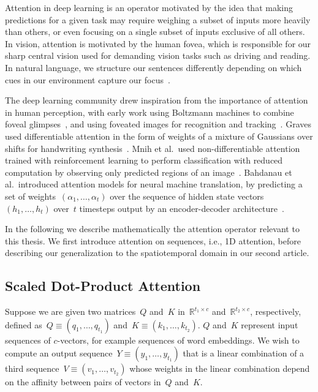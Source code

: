 Attention in deep learning is an operator motivated by the idea that making
predictions for a given task may require weighing a subset of inputs more
heavily than others, or even focusing on a single subset of inputs exclusive of
all others.
In vision, attention is motivated by the human fovea, which is responsible for
our sharp central vision used for demanding vision tasks such as driving and
reading.
In natural language, we structure our sentences differently depending on which
cues in our environment capture our focus~\citep{myachykov2005attention}.

The deep learning community drew inspiration from the importance of attention
in human perception, with early work using Boltzmann machines to combine foveal
glimpses~\citep{larochelle2010learning}, and using foveated images for
recognition and tracking~\citep{denil2012learning}.
Graves used differentiable attention in the form of weights of a mixture of
Gaussians over shifts for handwriting synthesis~\citep{graves2013generating}.
Mnih et al.\ used non-differentiable attention trained with reinforcement
learning to perform classification with reduced computation by observing only
predicted regions of an image~\citep{mnih2014recurrent}.
Bahdanau et al.\ introduced attention models for neural machine translation,
by predicting a set of weights~$(\alpha_1, \dots, \alpha_t)$ over the sequence
of hidden state vectors~$(h_1, \dots, h_t)$ over~$t$ timesteps output by an
encoder-decoder architecture~\citep{cho2014ontheproperties}.

In the following we describe mathematically the attention operator relevant to
this thesis.
We first introduce attention on sequences, i.e., 1D attention, before
describing our generalization to the spatiotemporal domain in our second
article.


\subsection{Scaled Dot-Product Attention}

Suppose we are given two matrices~$Q$ and~$K$ in~$\mathbb{R}^{t_1 \times c}$
and~$\mathbb{R}^{t_2\times c}$, respectively, defined
as~$Q \equiv (q_1, \dots, q_{t_1})$ and~$K \equiv (k_1, \dots, k_{t_2})$.
$Q$ and~$K$ represent input sequences of $c$-vectors, for example sequences of
word embeddings.
We wish to compute an output sequence~$Y \equiv (y_1, \dots, y_{t_1})$ that is
a linear combination of a third sequence~$V \equiv (v_1, \dots, v_{t_2})$ whose
weights in the linear combination depend on the affinity between pairs of
vectors in~$Q$ and~$K$.

